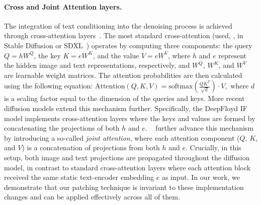 \paragraph{Cross and Joint Attention layers.} The integration of text conditioning into the denoising process is achieved through cross-attention layers~\citep{vaswani2017attention}. The most standard cross-attention (used, \eg, in Stable Diffusion or SDXL~\citep{rombach2022high}) operates by computing three components: the query \( Q = h W^Q \), the key \( K = e W^K \), and the value \( V = e W^V \), where \( h \) and \( e \) represent the hidden image and text representations, respectively, and \( W^Q \), \( W^K \), and \( W^V \) are learnable weight matrices. The attention probabilities are then calculated using the following equation: $\text{Attention}(Q, K, V) = \text{softmax}\left(\frac{Q K^T}{\sqrt{d}}\right) \cdot V,$
where \( d \) is a scaling factor equal to the dimension of the queries and keys.
More recent diffusion models extend this mechanism further. Specifically, the DeepFloyd IF~\citep{DeepFloydIF} model implements cross-attention layers where the keys and values are formed by concatenating the projections of both \( h \) and \( e \). ~\citet{esser2024scalingSD3} further advance this mechanism by introducing a so-called \textit{joint attention}, where each attention component (\( Q \), \( K \), and \( V \)) is a concatenation of projections from both \( h \) and \( e \). Crucially, in this setup, both image and text projections are propagated throughout the diffusion model, in contrast to standard cross-attention layers where each attention block received the same static text-encoder embedding \( e \) as input. In our work, we demonstrate that our patching technique is invariant to these implementation changes and can be applied effectively across all of them.





